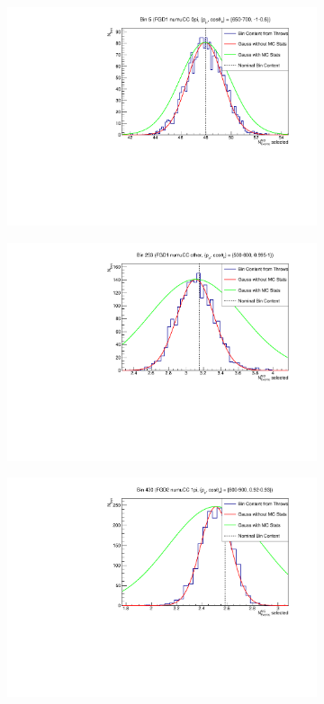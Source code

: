 \begin{figure}
\centering
\begin{subfigure}{.49\textwidth}
  \centering
  \includegraphics[width=0.95\linewidth]{figs/detbin_allsysts5}
\end{subfigure}
\begin{subfigure}{.49\textwidth}
  \centering
  \includegraphics[width=0.95\linewidth]{figs/detbin_allsysts253}
\end{subfigure}
\begin{subfigure}{.49\textwidth}
  \centering
  \includegraphics[width=0.95\linewidth]{figs/detbin_allsysts430}

\end{subfigure}
\end{figure}
